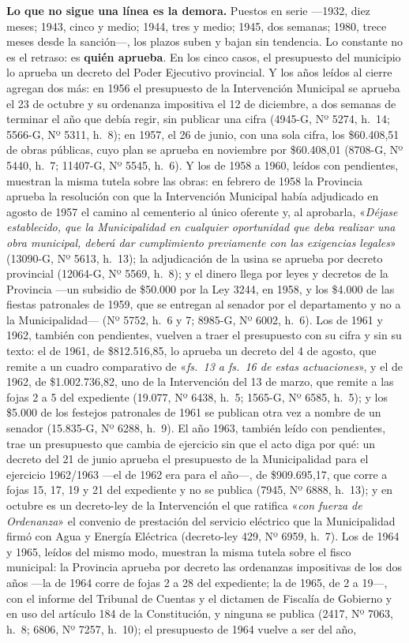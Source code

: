 \textbf{Lo que no sigue una línea es la demora.} Puestos en serie ---1932, diez meses; 1943,
cinco y medio; 1944, tres y medio; 1945, dos semanas; 1980, trece meses desde la sanción---, los plazos suben y
bajan sin tendencia. Lo constante no es el retraso: es \textbf{quién aprueba}. En los cinco
casos, el presupuesto del municipio lo aprueba un decreto del Poder Ejecutivo provincial. Y los años leídos al cierre agregan dos más: en 1956 el presupuesto de la Intervención Municipal se aprueba el 23 de octubre y su ordenanza impositiva el 12 de diciembre, a dos semanas de terminar el año que debía regir, sin publicar una cifra (4945-G, Nº 5274, h.\ 14; 5566-G, Nº 5311, h.\ 8); en 1957, el 26 de junio, con una sola cifra, los \$60.408,51 de obras públicas, cuyo plan se aprueba en noviembre por \$60.408,01 (8708-G, Nº 5440, h.\ 7; 11407-G, Nº 5545, h.\ 6). Y los de 1958 a 1960, leídos con pendientes, muestran la misma tutela sobre las obras: en febrero de 1958 la Provincia aprueba la resolución con que la Intervención Municipal había adjudicado en agosto de 1957 el camino al cementerio al único oferente y, al aprobarla, «\textit{Déjase establecido, que la Municipalidad en cualquier oportunidad que deba realizar una obra municipal, deberá dar cumplimiento previamente con las exigencias legales}» (13090-G, Nº 5613, h.\ 13); la adjudicación de la usina se aprueba por decreto provincial (12064-G, Nº 5569, h.\ 8); y el dinero llega por leyes y decretos de la Provincia ---un subsidio de \$50.000 por la Ley 3244, en 1958, y los \$4.000 de las fiestas patronales de 1959, que se entregan al senador por el departamento y no a la Municipalidad--- (Nº 5752, h.\ 6 y 7; 8985-G, Nº 6002, h.\ 6). Los de 1961 y 1962, también con pendientes, vuelven a traer el presupuesto con su cifra y sin su texto: el de 1961, de \$812.516,85, lo aprueba un decreto del 4 de agosto, que remite a un cuadro comparativo de «\textit{fs.\ 13 a fs.\ 16 de estas actuaciones}», y el de 1962, de \$1.002.736,82, uno de la Intervención del 13 de marzo, que remite a las fojas 2 a 5 del expediente (19.077, Nº 6438, h.\ 5; 1565-G, Nº 6585, h.\ 5); y los \$5.000 de los festejos patronales de 1961 se publican otra vez a nombre de un senador (15.835-G, Nº 6288, h.\ 9). El año 1963, también leído con pendientes, trae un presupuesto que cambia de ejercicio sin que el acto diga por qué: un decreto del 21 de junio aprueba el presupuesto de la Municipalidad para el ejercicio 1962/1963 ---el de 1962 era para el año---, de \$909.695,17, que corre a fojas 15, 17, 19 y 21 del expediente y no se publica (7945, Nº 6888, h.\ 13); y en octubre es un decreto-ley de la Intervención el que ratifica «\textit{con fuerza de Ordenanza}» el convenio de prestación del servicio eléctrico que la Municipalidad firmó con Agua y Energía Eléctrica (decreto-ley 429, Nº 6959, h.\ 7). Los de 1964 y 1965, leídos del mismo modo, muestran la misma tutela sobre el fisco municipal: la Provincia aprueba por decreto las ordenanzas impositivas de los dos años ---la de 1964 corre de fojas 2 a 28 del expediente; la de 1965, de 2 a 19---, con el informe del Tribunal de Cuentas y el dictamen de Fiscalía de Gobierno y en uso del artículo 184 de la Constitución, y ninguna se publica (2417, Nº 7063, h.\ 8; 6806, Nº 7257, h.\ 10); el presupuesto de 1964 vuelve a ser del año, 